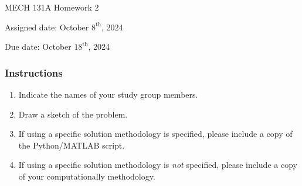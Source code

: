 \documentclass[12pt,letterpaper]{article}
\begin{document}
\noindent
MECH 131A Homework 2

\noindent
Assigned date: October $8^{\mathrm{th}}$, 2024

\noindent
Due date: October $18^{\mathrm{th}}$, 2024

\subsubsection*{Instructions}
\begin{enumerate}
	\item Indicate the names of your study group members.
	\item Draw a sketch of the problem.
	\item If using a specific solution methodology is specified, please include a copy of the Python/MATLAB script.
	\item If using a specific solution methodology is \textit{not} specified, please include a copy of your computationally methodology.
\end{enumerate}
\end{document}
